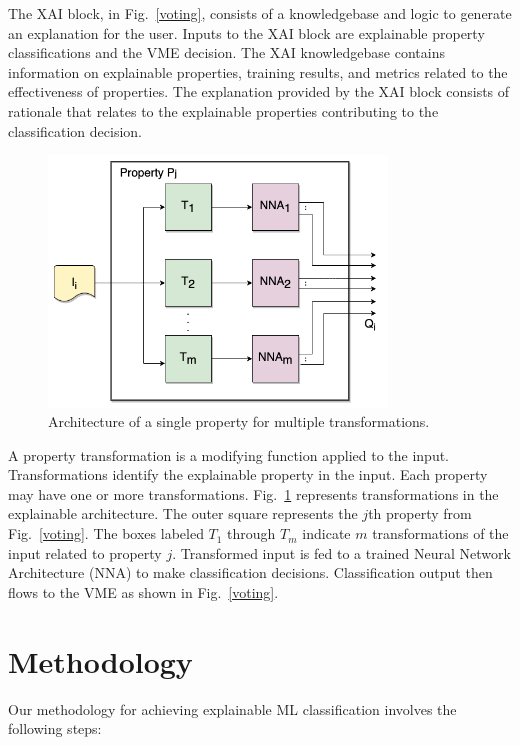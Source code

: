 \documentclass[conference]{IEEEtran}
\begin{document}
The XAI block, in Fig.~\ref{voting}, consists of a knowledgebase and logic to
generate an explanation for the user.  Inputs to the XAI block are explainable
property classifications and the VME decision.  The XAI knowledgebase contains
information on explainable properties, training results, and metrics related to
the effectiveness of properties.  The explanation provided by the XAI block
consists of rationale that relates to the explainable properties contributing to
the classification decision.

 \begin{figure}[htbp]
\centerline{\includegraphics[width=90mm]{./images/property_transforms.png}}
\caption{Architecture of a single property for multiple transformations.}
\label{proptrans}
\end{figure} 

A property transformation is a modifying function applied to the input.
Transformations identify the explainable property in the input.  Each property
may have one or more transformations.   Fig.~\ref{proptrans} represents
transformations in the explainable architecture.  The outer square represents
the $j$th property from Fig.~\ref{voting}.  The boxes labeled $T_1$ through
$T_m$ indicate $m$ transformations of the input related to property $j$.
Transformed input is fed to a trained Neural Network Architecture (NNA) to make
classification decisions.  Classification output then flows to the VME as shown
in Fig.~\ref{voting}.

\section{Methodology}
 
Our methodology for achieving explainable ML classification involves the
following steps:
\end{document}
